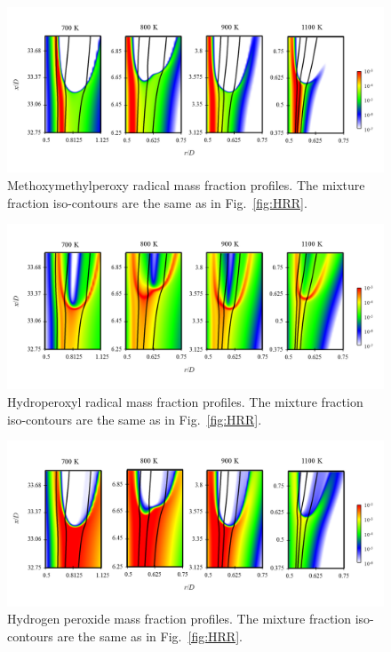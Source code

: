 \documentclass[review,3p,times]{elsarticle}
\begin{document}
\begin{figure}[t]
  \centering
  \scriptsize
  \vspace{-0.1in}
  \includegraphics[width=1.0\textwidth]{RO2.png}
  \normalsize
  \vspace{-0.1in}
  \caption{Methoxymethylperoxy radical mass fraction profiles.  The mixture fraction iso-contours are the same as in Fig.~\ref{fig:HRR}.}
  \label{fig:RO2}
\end{figure}

\begin{figure}[t]
  \centering
  \scriptsize
  \vspace{-0.1in}
  \includegraphics[width=1.0\textwidth]{HO2.png}
  \normalsize
  \vspace{-0.1in}
  \caption{Hydroperoxyl radical mass fraction profiles.  The mixture fraction iso-contours are the same as in Fig.~\ref{fig:HRR}.}
  \label{fig:HO2}
\end{figure}

\begin{figure}[t]
  \centering
  \scriptsize
  \vspace{-0.1in}
  \includegraphics[width=1.0\textwidth]{H2O2.png}
  \normalsize
  \vspace{-0.1in}
  \caption{Hydrogen peroxide mass fraction profiles.  The mixture fraction iso-contours are the same as in Fig.~\ref{fig:HRR}.}
  \label{fig:H2O2}
\end{figure}
\end{document}
